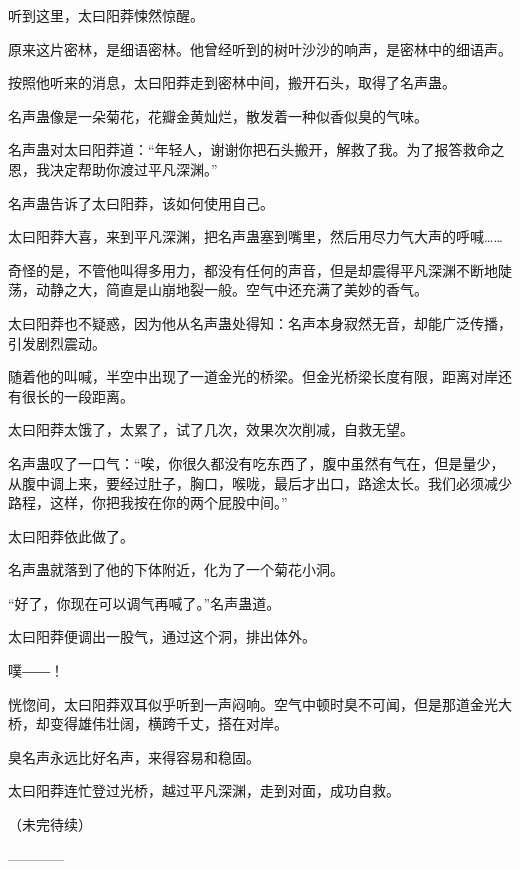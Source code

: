 \begin{this_body}
听到这里，太曰阳莽悚然惊醒。

原来这片密林，是细语密林。他曾经听到的树叶沙沙的响声，是密林中的细语声。

按照他听来的消息，太曰阳莽走到密林中间，搬开石头，取得了名声蛊。

名声蛊像是一朵菊花，花瓣金黄灿烂，散发着一种似香似臭的气味。

名声蛊对太曰阳莽道：“年轻人，谢谢你把石头搬开，解救了我。为了报答救命之恩，我决定帮助你渡过平凡深渊。”

名声蛊告诉了太曰阳莽，该如何使用自己。

太曰阳莽大喜，来到平凡深渊，把名声蛊塞到嘴里，然后用尽力气大声的呼喊……

奇怪的是，不管他叫得多用力，都没有任何的声音，但是却震得平凡深渊不断地陡荡，动静之大，简直是山崩地裂一般。空气中还充满了美妙的香气。

太曰阳莽也不疑惑，因为他从名声蛊处得知：名声本身寂然无音，却能广泛传播，引发剧烈震动。

随着他的叫喊，半空中出现了一道金光的桥梁。但金光桥梁长度有限，距离对岸还有很长的一段距离。

太曰阳莽太饿了，太累了，试了几次，效果次次削减，自救无望。

名声蛊叹了一口气：“唉，你很久都没有吃东西了，腹中虽然有气在，但是量少，从腹中调上来，要经过肚子，胸口，喉咙，最后才出口，路途太长。我们必须减少路程，这样，你把我按在你的两个屁股中间。”

太曰阳莽依此做了。

名声蛊就落到了他的下体附近，化为了一个菊花小洞。

“好了，你现在可以调气再喊了。”名声蛊道。

太曰阳莽便调出一股气，通过这个洞，排出体外。

噗――！

恍惚间，太曰阳莽双耳似乎听到一声闷响。空气中顿时臭不可闻，但是那道金光大桥，却变得雄伟壮阔，横跨千丈，搭在对岸。

臭名声永远比好名声，来得容易和稳固。

太曰阳莽连忙登过光桥，越过平凡深渊，走到对面，成功自救。

（未完待续）

------------

\end{this_body}

